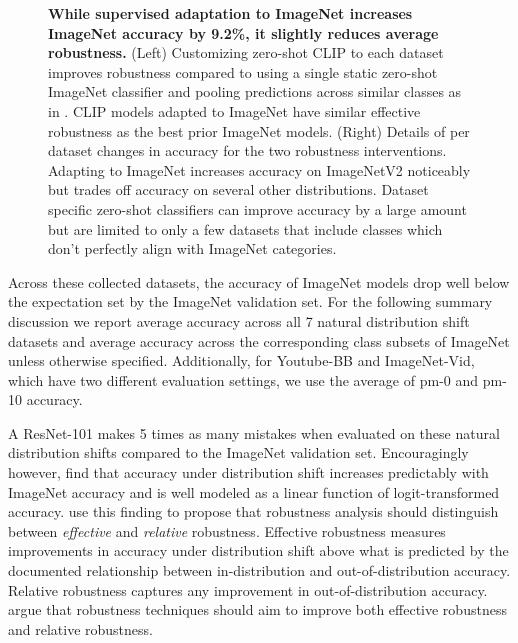 \documentclass{article}
\begin{document}
\begin{figure}[t]
\begin{center}
\caption{\textbf{While supervised adaptation to ImageNet increases ImageNet accuracy by 9.2\%, it slightly reduces average robustness.} (Left) Customizing zero-shot CLIP to each dataset improves robustness compared to using a single static zero-shot ImageNet classifier and pooling predictions across similar classes as in \citet{taori2020measuring}. CLIP models adapted to ImageNet have similar effective robustness as the best prior ImageNet models. (Right) Details of per dataset changes in accuracy for the two robustness interventions. Adapting to ImageNet increases accuracy on ImageNetV2 noticeably but trades off accuracy on several other distributions. Dataset specific zero-shot classifiers can improve accuracy by a large amount but are limited to only a few datasets that include classes which don't perfectly align with ImageNet categories.}
\label{robustness_interventions}
\end{center}
\end{figure}

Across these collected datasets, the accuracy of ImageNet models drop well below the expectation set by the ImageNet validation set. For the following summary discussion we report average accuracy across all 7 natural distribution shift datasets and average accuracy across the corresponding class subsets of ImageNet unless otherwise specified. Additionally, for Youtube-BB and ImageNet-Vid, which have two different evaluation settings, we use the average of pm-0 and pm-10 accuracy. 

A ResNet-101 makes 5 times as many mistakes when evaluated on these natural distribution shifts compared to the ImageNet validation set. Encouragingly however, \citet{taori2020measuring} find that accuracy under distribution shift increases predictably with ImageNet accuracy and is well modeled as a linear function of logit-transformed accuracy. \citet{taori2020measuring} use this finding to propose that robustness analysis should distinguish between \textit{effective} and \textit{relative} robustness. Effective robustness measures improvements in accuracy under distribution shift above what is predicted by the documented relationship between in-distribution and out-of-distribution accuracy. Relative robustness captures any improvement in out-of-distribution accuracy. \citet{taori2020measuring} argue that robustness techniques should aim to improve both effective robustness and relative robustness.
\end{document}

